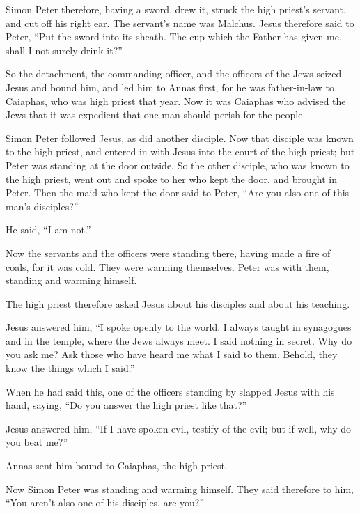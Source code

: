 \begin{paracol}{2}
\begin{otherlanguage}{english}
 Simon Peter therefore, having a sword, drew it, struck
the high priest's servant, and cut off his right ear. The servant's name
was Malchus.  Jesus therefore said to Peter, ``Put the
sword into its sheath. The cup which the Father has given me, shall I
not surely drink it?''

 So the detachment, the commanding officer, and the
officers of the Jews seized Jesus and bound him,  and led
him to Annas first, for he was father-in-law to Caiaphas, who was high
priest that year.  Now it was Caiaphas who advised the
Jews that it was expedient that one man should perish for the people.

 Simon Peter followed Jesus, as did another disciple. Now
that disciple was known to the high priest, and entered in with Jesus
into the court of the high priest;  but Peter was
standing at the door outside. So the other disciple, who was known to
the high priest, went out and spoke to her who kept the door, and
brought in Peter.  Then the maid who kept the door said
to Peter, ``Are you also one of this man's disciples?''

He said, ``I am not.''

 Now the servants and the officers were standing there,
having made a fire of coals, for it was cold. They were warming
themselves. Peter was with them, standing and warming himself.

 The high priest therefore asked Jesus about his
disciples and about his teaching.

 Jesus answered him, ``I spoke openly to the world. I
always taught in synagogues and in the temple, where the Jews always
meet. I said nothing in secret.  Why do you ask me? Ask
those who have heard me what I said to them. Behold, they know the
things which I said.''

 When he had said this, one of the officers standing by
slapped Jesus with his hand, saying, ``Do you answer the high priest
like that?''

 Jesus answered him, ``If I have spoken evil, testify of
the evil; but if well, why do you beat me?''

 Annas sent him bound to Caiaphas, the high priest.

 Now Simon Peter was standing and warming himself. They
said therefore to him, ``You aren't also one of his disciples, are
you?''


\end{otherlanguage}
\end{paracol}
